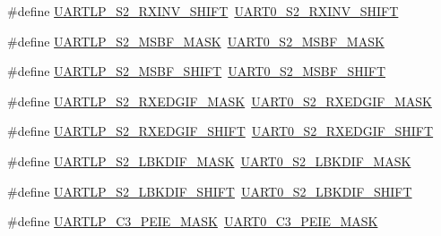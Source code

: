 \begin{DoxyCompactItemize}
\item 
\#define \hyperlink{group___backward___compatibility___symbols_gafad67c9021f86de6c0d08f8c72457a26}{U\+A\+R\+T\+L\+P\+\_\+\+S2\+\_\+\+R\+X\+I\+N\+V\+\_\+\+S\+H\+I\+FT}~\hyperlink{group___u_a_r_t0___register___masks_ga7c2ed6447fb3c4daa5ed8fd4b29cffca}{U\+A\+R\+T0\+\_\+\+S2\+\_\+\+R\+X\+I\+N\+V\+\_\+\+S\+H\+I\+FT}
\item 
\#define \hyperlink{group___backward___compatibility___symbols_ga41b1656314af8d525f36c119201f43a6}{U\+A\+R\+T\+L\+P\+\_\+\+S2\+\_\+\+M\+S\+B\+F\+\_\+\+M\+A\+SK}~\hyperlink{group___u_a_r_t0___register___masks_ga3d18e7a9445af9999a425598ae57dd1a}{U\+A\+R\+T0\+\_\+\+S2\+\_\+\+M\+S\+B\+F\+\_\+\+M\+A\+SK}
\item 
\#define \hyperlink{group___backward___compatibility___symbols_ga2bfcba2957fb07036e3f1aaacebcfa1a}{U\+A\+R\+T\+L\+P\+\_\+\+S2\+\_\+\+M\+S\+B\+F\+\_\+\+S\+H\+I\+FT}~\hyperlink{group___u_a_r_t0___register___masks_gae193269e5cdcca203195efc7bd5a7e13}{U\+A\+R\+T0\+\_\+\+S2\+\_\+\+M\+S\+B\+F\+\_\+\+S\+H\+I\+FT}
\item 
\#define \hyperlink{group___backward___compatibility___symbols_ga3ff5db6c0a297c27ffc6435304503f4d}{U\+A\+R\+T\+L\+P\+\_\+\+S2\+\_\+\+R\+X\+E\+D\+G\+I\+F\+\_\+\+M\+A\+SK}~\hyperlink{group___u_a_r_t0___register___masks_gaa8912e7668721bb52173cf2d57d9a2df}{U\+A\+R\+T0\+\_\+\+S2\+\_\+\+R\+X\+E\+D\+G\+I\+F\+\_\+\+M\+A\+SK}
\item 
\#define \hyperlink{group___backward___compatibility___symbols_gad414e0468b66c66ff2e90d1f8476c5fe}{U\+A\+R\+T\+L\+P\+\_\+\+S2\+\_\+\+R\+X\+E\+D\+G\+I\+F\+\_\+\+S\+H\+I\+FT}~\hyperlink{group___u_a_r_t0___register___masks_ga0e308d65c84418d41a1e1e7e08d2f49a}{U\+A\+R\+T0\+\_\+\+S2\+\_\+\+R\+X\+E\+D\+G\+I\+F\+\_\+\+S\+H\+I\+FT}
\item 
\#define \hyperlink{group___backward___compatibility___symbols_gaa43c6661dd27a409a7e7e17506c6bfde}{U\+A\+R\+T\+L\+P\+\_\+\+S2\+\_\+\+L\+B\+K\+D\+I\+F\+\_\+\+M\+A\+SK}~\hyperlink{group___u_a_r_t0___register___masks_gac15518365f64c684798c3480deaf83f0}{U\+A\+R\+T0\+\_\+\+S2\+\_\+\+L\+B\+K\+D\+I\+F\+\_\+\+M\+A\+SK}
\item 
\#define \hyperlink{group___backward___compatibility___symbols_ga82b6d0e62d2a3a3eeed35d124fb2b31c}{U\+A\+R\+T\+L\+P\+\_\+\+S2\+\_\+\+L\+B\+K\+D\+I\+F\+\_\+\+S\+H\+I\+FT}~\hyperlink{group___u_a_r_t0___register___masks_gabeff0aee55751aab92571d26a934a04a}{U\+A\+R\+T0\+\_\+\+S2\+\_\+\+L\+B\+K\+D\+I\+F\+\_\+\+S\+H\+I\+FT}
\item 
\#define \hyperlink{group___backward___compatibility___symbols_ga4cc8bfb380818563bdfa2f98fbde7710}{U\+A\+R\+T\+L\+P\+\_\+\+C3\+\_\+\+P\+E\+I\+E\+\_\+\+M\+A\+SK}~\hyperlink{group___u_a_r_t0___register___masks_ga756c38b1457b21e8bc4c364f890b7390}{U\+A\+R\+T0\+\_\+\+C3\+\_\+\+P\+E\+I\+E\+\_\+\+M\+A\+SK}

\end{DoxyCompactItemize}
